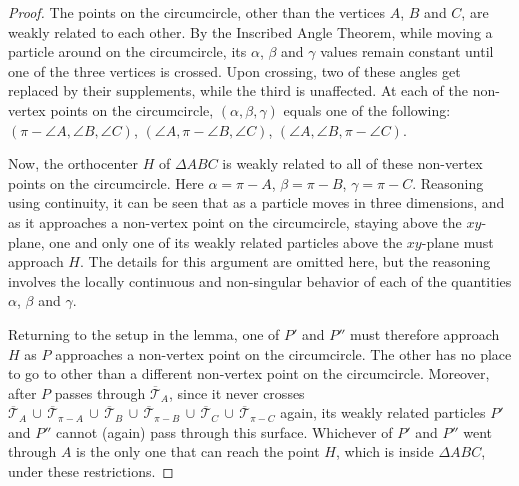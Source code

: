 \documentclass[a4paper, twoside]{article}
\begin{document}
\begin{proof}

The points on the circumcircle, other than the vertices $A$, $B$ and $C$, are weakly related to each other. By the Inscribed Angle Theorem, while moving a particle around on the circumcircle, its $\alpha$, $\beta$ and $\gamma$ values remain constant until one of the three vertices is crossed. Upon crossing, two of these angles get replaced by their supplements, while the third is unaffected.  At each of the non-vertex points on the circumcircle, $(\alpha, \beta, \gamma)$ equals one of the following: $(\pi-\angle A, \angle B, \angle C)$, $(\angle A, \pi-\angle B, \angle C)$, $(\angle A, \angle B, \pi-\angle C)$.  

Now, the orthocenter $H$ of $\Delta ABC$ is weakly related to all of these non-vertex points on the circumcircle. Here $\alpha = \pi - A$, $\beta = \pi - B$, $\gamma = \pi - C$. Reasoning using continuity, it can be seen that as a particle moves in three dimensions, and as it approaches a non-vertex point on the circumcircle, staying above the $xy$-plane, one and only one of its weakly related particles above the $xy$-plane must approach $H$. The details for this argument are omitted here, but the reasoning involves the locally continuous and non-singular behavior of each of the quantities $\alpha$, $\beta$ and $\gamma$. 

Returning to the setup in the lemma, one of $P'$ and $P''$ must therefore approach $H$ as $P$ approaches a non-vertex point on the circumcircle. The other has no place to go to other than a different non-vertex point on the circumcircle. Moreover, after $P$ passes through $\overline{\mathcal{T}}_A$, since it never crosses $\overline{\mathcal{T}}_A \, \cup \, \overline{\mathcal{T}}_{\pi-A} \, \cup \, \overline{\mathcal{T}}_B \, \cup \, \overline{\mathcal{T}}_{\pi-B} \, \cup \, \overline{\mathcal{T}}_C \, \cup \, \overline{\mathcal{T}}_{\pi-C}$ again, its weakly related particles $P'$ and $P''$ cannot (again) pass through this surface. Whichever of $P'$ and $P''$ went through $A$ is the only one that can reach the point $H$, which is inside $\Delta ABC$, under these restrictions.

\end{proof}

\vspace{2mm}
\end{document}
